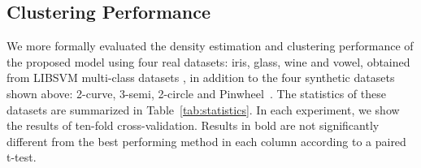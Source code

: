 \subsection{Clustering Performance}
We more formally evaluated the density estimation and clustering performance of the proposed model using four real datasets: iris, glass, wine and vowel,
 obtained from LIBSVM multi-class datasets \cite{chang2011libsvm}, in addition to the four synthetic datasets shown above: 2-curve, 3-semi, 2-circle and Pinwheel~\cite{adams2009archipelago}.
The statistics of these datasets are summarized in Table~\ref{tab:statistics}.
In each experiment, we show the results of ten-fold cross-validation.
Results in bold are not significantly different from the best performing method in each column according to a paired t-test.
%
%

